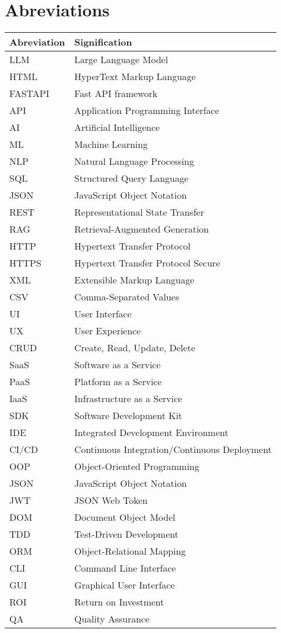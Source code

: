 \chapter*{Abreviations}
\begin{tabular}{ll}
\textbf{Abreviation} & \textbf{Signification} \\
\hline
LLM & Large Language Model \\
HTML & HyperText Markup Language \\
FASTAPI & Fast API framework \\
API & Application Programming Interface \\
AI & Artificial Intelligence \\
ML & Machine Learning \\
NLP & Natural Language Processing \\
SQL & Structured Query Language \\
JSON & JavaScript Object Notation \\
REST & Representational State Transfer \\
RAG & Retrieval-Augmented Generation \\
HTTP & Hypertext Transfer Protocol \\
HTTPS & Hypertext Transfer Protocol Secure \\
XML & Extensible Markup Language \\
CSV & Comma-Separated Values \\
UI & User Interface \\
UX & User Experience \\
CRUD & Create, Read, Update, Delete \\
SaaS & Software as a Service \\
PaaS & Platform as a Service \\
IaaS & Infrastructure as a Service \\
SDK & Software Development Kit \\
IDE & Integrated Development Environment \\
CI/CD & Continuous Integration/Continuous Deployment \\
OOP & Object-Oriented Programming \\
JSON & JavaScript Object Notation \\
JWT & JSON Web Token \\
DOM & Document Object Model \\
TDD & Test-Driven Development \\
ORM & Object-Relational Mapping \\
CLI & Command Line Interface \\
GUI & Graphical User Interface \\
ROI & Return on Investment \\
QA & Quality Assurance \\
\end{tabular}
